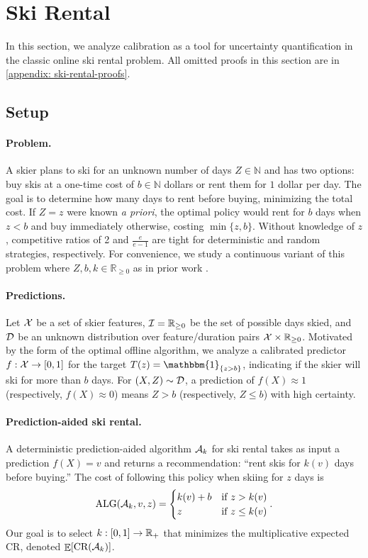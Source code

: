 \section{Ski Rental}
In this section, we analyze calibration as a tool for uncertainty quantification in the classic online ski rental problem.
All omitted proofs in this section are in \cref{appendix: ski-rental-proofs}.

\subsection{Setup}
\paragraph{Problem.} A skier plans to ski for an unknown number of days $Z \in \mathbb{N}$ and has two options: buy skis at a one-time cost of $b \in \mathbb{N}$ dollars or rent them for $1$ dollar per day. The goal is to determine how many days to rent before buying, minimizing the total cost. If $Z=z$ were known \textit{a priori}, the optimal policy would rent for $b$ days when $z < b$ and buy immediately otherwise, costing $\min\{z, b\}$. Without knowledge of $z$, competitive ratios of 2 \citep{Karlin88:Competitive} and $\frac{e}{e-1}$ \citep{Karlin94:Competitive} are tight for deterministic and random strategies, respectively. For convenience, we study a continuous variant of this problem where $Z, b, k \in \mathbb{R}_{\geq 0}$ as in prior work \citep{Anand20:Customizing,Sun24:Online}.

\paragraph{Predictions.} Let $\mathcal{X}$ be a set of skier features, $\mathcal{I}=\mathbb{R}_{\geq 0}$ be the set of possible days skied, and $\mathcal{D}$ be an unknown distribution over feature/duration pairs $\mathcal{X} \times \mathbb{R}_{\geq 0}$. Motivated by the form of the optimal offline algorithm, we analyze a calibrated predictor $f:\mathcal{X} \to [0,1]$ for the target $T(z)=\mathbbm{1}_{\{z > b\}}$, indicating if the skier will ski for more than $b$ days. For $(X, Z) \sim \mathcal{D}$, a prediction of $f(X) \approx 1$ (respectively, $f(X) \approx 0$) means $Z > b$ (respectively, $Z \leq b$) with high certainty.

\paragraph{Prediction-aided ski rental.} A deterministic prediction-aided algorithm $\mathcal{A}_k$ for ski rental takes as input a prediction $f(X)=v$ and returns a recommendation: ``rent skis for $k(v)$ days before buying.'' The cost of following this policy when skiing for $z$ days is \[\textnormal{ALG}(\mathcal{A}_k, v, z) = \begin{cases}
    k(v) + b & \text{if $z > k(v)$} \\
    z &\text{if $z \leq k(v)$}
\end{cases}.\]
Our goal is to select $k:[0,1] \to \mathbb{R}_+$ that minimizes the multiplicative expected CR, denoted $\mathop{\mathbb{E}}[\textnormal{CR}(\mathcal{A}_k)]$.


